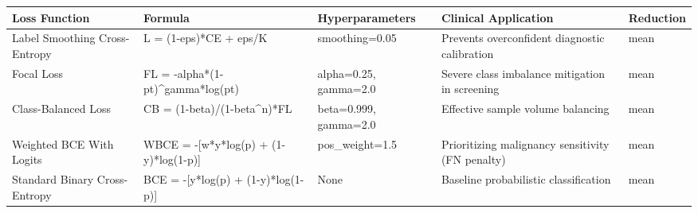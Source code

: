 \begin{tabular}{lllll}
\toprule
Loss Function & Formula & Hyperparameters & Clinical Application & Reduction \\
\midrule
Label Smoothing Cross-Entropy & L = (1-eps)*CE + eps/K & smoothing=0.05 & Prevents overconfident diagnostic calibration & mean \\
Focal Loss & FL = -alpha*(1-pt)\textasciicircum gamma*log(pt) & alpha=0.25, gamma=2.0 & Severe class imbalance mitigation in screening & mean \\
Class-Balanced Loss & CB = (1-beta)/(1-beta\textasciicircum n)*FL & beta=0.999, gamma=2.0 & Effective sample volume balancing & mean \\
Weighted BCE With Logits & WBCE = -[w*y*log(p) + (1-y)*log(1-p)] & pos\_weight=1.5 & Prioritizing malignancy sensitivity (FN penalty) & mean \\
Standard Binary Cross-Entropy & BCE = -[y*log(p) + (1-y)*log(1-p)] & None & Baseline probabilistic classification & mean \\
\bottomrule
\end{tabular}
